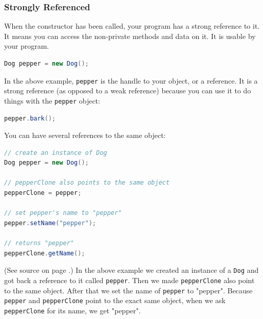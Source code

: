 \subsubsection{Strongly Referenced}
When the constructor has been called, your program has a strong reference to it.\cite{reference} It means you can access the non-private methods and data on it. It is usable by your program.
\begin{lstlisting}[language=Java]
Dog pepper = new Dog();
\end{lstlisting}
In the above example, \texttt{pepper} is the handle to your object, or a reference. It is a strong reference (as opposed to a weak reference) because you can use it to do things with the \texttt{pepper} object:
\begin{lstlisting}[language=Java]
pepper.bark();
\end{lstlisting}

You can have several references to the same object:
\begin{lstlisting}[language=Java]
// create an instance of Dog
Dog pepper = new Dog();

// pepperClone also points to the same object
pepperClone = pepper;

// set pepper's name to "pepper"
pepper.setName("pepper");

// returns "pepper"
pepperClone.getName();

\end{lstlisting}
(See source on page \pageref{App:AppendixA}.)
In the above example we created an instance of a \texttt{Dog} and got back a reference to it called \texttt{pepper}. Then we made \texttt{pepperClone} also point to the same object. After that we set the name of \texttt{pepper} to "pepper". Because \texttt{pepper} and \texttt{pepperClone} point to the exact same object, when we ask \texttt{pepperClone} for its name, we get "pepper".

